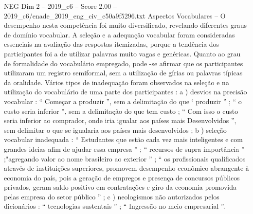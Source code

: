 \begin{textsample}{NEG Dim 2 – 2019\_c6 – Score 2.00 – 2019\_c6/enade\_2019\_eng\_civ\_e50a9f5296.txt}
Aspectos Vocabulares – O desempenho nesta competência foi muito diversificado, revelando diferentes graus de domínio vocabular.
A seleção e a adequação vocabular foram consideradas essenciais na avaliação das respostas itemizadas, porque a tendência dos participantes foi a de utilizar palavras muito vagas e genéricas.
Quanto ao grau de formalidade do vocabulário empregado, pode -se afirmar que os participantes utilizaram um registro semiformal, sem a utilização de gírias ou palavras típicas da oralidade.
Vários tipos de inadequação foram observados na seleção e na utilização do vocabulário de uma parte dos participantes : a ) desvios na precisão vocabular : “ Começar a produzir ”, sem a delimitação do que ‘ produzir ” ; “ o custo seria inferior ”, sem a delimitação do que tem custo ; “ Com isso o custo seria inferior ao comprador, onde iria igualar aos países mais Desenvolvidos ”, sem delimitar o que se igualaria aos países mais desenvolvidos ; b ) seleção vocabular inadequada : “ Estudantes que estão cada vez mais inteligentes e com grandes ideias afim de ajudar essa empresa ” ; “ recursos de supra importância ” ;"agregando valor ao nome brasileiro ao exterior ” ; “ os profissionais qualificados através de instituições superiores, promovem desempenho econômico abrangente à economia do país, pois a geração de empregos e presença de concursos públicos privados, geram saldo positivo em contratações e giro da economia promovida pelas empresa do setor público ” ; c ) neologismos não autorizados pelos dicionários : “ tecnologias sustentais ” ; “ Ingressão no meio empresarial ”.

\end{textsample}
